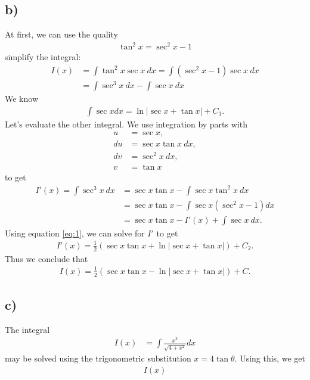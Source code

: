 \documentclass{article}
\begin{document}
\subsection*{b)}
At first, we can use the quality
\begin{align*}
  \tan^2 x = \sec^2 x - 1
\end{align*}
simplify the integral:
\begin{align*}
  I(x) &= \int \tan^2 x \sec x\:dx 
  = \int (\sec^2 x - 1)\sec x\:dx \\
  &= \int \sec^3 x\:dx  - \int \sec x\:dx
\end{align*}
We know 
\begin{align}
  \label{eq:1}
  \int \sec x dx = \ln |\sec x + \tan x| + C_1.
\end{align}
Let's evaluate the other integral. We use integration by parts with
\begin{align*}
  u &= \sec x, \\
  du &= \sec x \tan x\: dx,\\
  dv &= \sec^2 x\: dx, \\
  v &= \tan x
\end{align*}
to get
\begin{align*}
  I'(x)=\int \sec^3 x \: dx&=\sec x\tan x - \int \sec x \tan^2 x\: dx\\
  &= \sec x \tan x - \int \sec x (\sec^2 x - 1)dx\\
  &= \sec x \tan x - I'(x) + \int \sec x \: dx.
\end{align*}
Using equation \ref{eq:1}, we can solve for $I'$ to get
\begin{align*}
  I'(x)=\frac{1}{2}(\sec x \tan x + \ln |\sec x + \tan x|) + C_2.
\end{align*}
Thus we conclude that
\begin{align*}
  I(x)=\frac{1}{2}(\sec x \tan x -\ln |\sec x + \tan x|) + C.
\end{align*}
\subsection*{c)}
The integral
\begin{align*}
  I(x) &= \int \frac{x^3}{\sqrt{4+x^2}}dx 
\end{align*}
may be solved using the trigonometric substitution $x = 4 \tan \theta$. Using this, we get
\begin{align*}
  I(x) 
\end{align*}
\end{document}
